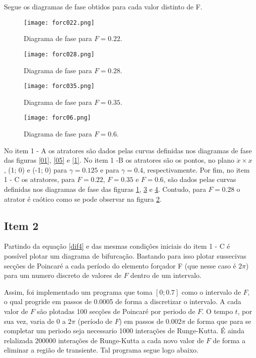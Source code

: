 \documentclass[a4paper,11pt, twoside]{article}
\begin{document}
    Segue os diagramas de fase obtidos para cada valor distinto de F.
    \begin{figure}[!ht]
        \centering
        \texttt{[image: forc022.png]}
        \caption{Diagrama de fase para $F = 0.22$.\label{022}}
    \end{figure}
    \begin{figure}[!ht]
        \centering
        \texttt{[image: forc028.png]}
        \caption{Diagrama de fase para $F = 0.28$.\label{028}}
    \end{figure}
    \newpage
    \begin{figure}[!ht]
        \centering
        \texttt{[image: forc035.png]}
        \caption{Diagrama de fase para $F = 0.35$.\label{035}}
    \end{figure}
    \begin{figure}[!ht]
        \centering
        \texttt{[image: forc06.png]}
        \caption{Diagrama de fase para $F = 0.6$.\label{06}}
    \end{figure}
    
    No item 1 - A os atratores são dados pelas curvas definidas
    nos diagramas de fase das figuras \ref{01}, \ref{05} e \ref{1}.
    No item 1 -B os atratores  são os pontos, no plano $\dot{x}\times x$, (1; 0) e (-1; 0) 
    para $\gamma = 0.125$ e para $\gamma = 0.4$, respectivamente.
    Por fim, no item 1 - C os atratores, para  $F = 0.22$, $F = 0.35$ e $F = 0.6$,
    são dados pelas curvas definidas
    nos diagramas de fase das figuras \ref{022}, \ref{035} e \ref{06}. Contudo,
    para $F = 0.28$ o atrator é caótico como se pode observar na figura \ref{028}.
    
    \subsection*{Item 2}
    Partindo da equação \eqref{dif4} e das mesmas condições iniciais do item 1 - C é possível
    plotar um diagrama de bifurcação. Bastando para isso plotar sussecivas secções de Poincaré
    a cada período do elemento forçador F (que nesse caso é $2\pi$) para um numero discreto de 
    valores de $F$ dentro de um intervalo.
    
    Assim, foi implementado um programa que toma $[0; 0.7]$ como o intervalo de $F$, o qual progride 
    em passos de 0.0005 de forma a discretizar o intervalo. A cada valor de $F$ são plotadas 100 secções de
    Poincaré por periodo de $F$. O tempo $t$, por sua vez, varia de 0 a $2\pi$ (período de $F$) em passos de 0.002$\pi$
    de forma que para se completar um periodo seja necessario 1000 interações de Runge-Kutta.
    É ainda relalizada 200000 interações de Runge-Kutta a cada novo valor de 
    $F$ de forma a eliminar a região de transiente.
    Tal programa segue logo abaixo.
    
\end{document}
